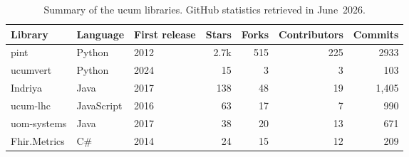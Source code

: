 \begin{table}[h]
\centering
\caption{Summary of the \ac{ucum} libraries. GitHub statistics retrieved in June~2026.}
\label{tab:ucum-libraries}
\begin{tabular}{lllrrrr}
\toprule
Library      & Language   & First release & Stars & Forks & Contributors & Commits \\
\midrule
pint         & Python     & 2012          & 2.7k  & 515   & 225         & 2933    \\
ucumvert     & Python     & 2024          & 15    & 3     & 3            & 103     \\
Indriya      & Java       & 2017          & 138   & 48    & 19           & 1,405   \\
ucum-lhc    & JavaScript & 2016          & 63    & 17    & 7            & 990     \\
uom-systems  & Java       & 2017          & 38    & 20    & 13           & 671     \\
Fhir.Metrics & C\#        & 2014          & 24    & 15    & 12           & 209     \\
\bottomrule
\end{tabular}
\end{table}


